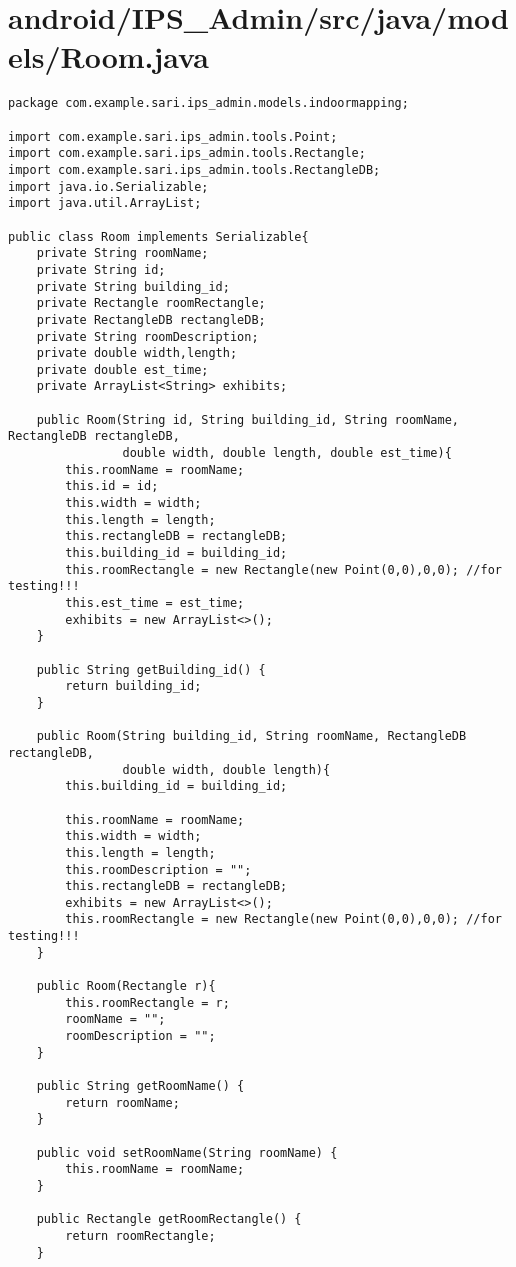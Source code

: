 \section{android/IPS\_Admin/src/java/models/Room.java}
\begin{lstlisting}package com.example.sari.ips_admin.models.indoormapping;

import com.example.sari.ips_admin.tools.Point;
import com.example.sari.ips_admin.tools.Rectangle;
import com.example.sari.ips_admin.tools.RectangleDB;
import java.io.Serializable;
import java.util.ArrayList;

public class Room implements Serializable{
    private String roomName;
    private String id;
    private String building_id;
    private Rectangle roomRectangle;
    private RectangleDB rectangleDB;
    private String roomDescription;
    private double width,length;
    private double est_time;
    private ArrayList<String> exhibits;

    public Room(String id, String building_id, String roomName, RectangleDB rectangleDB,
                double width, double length, double est_time){
        this.roomName = roomName;
        this.id = id;
        this.width = width;
        this.length = length;
        this.rectangleDB = rectangleDB;
        this.building_id = building_id;
        this.roomRectangle = new Rectangle(new Point(0,0),0,0); //for testing!!!
        this.est_time = est_time;
        exhibits = new ArrayList<>();
    }

    public String getBuilding_id() {
        return building_id;
    }

    public Room(String building_id, String roomName, RectangleDB rectangleDB,
                double width, double length){
        this.building_id = building_id;

        this.roomName = roomName;
        this.width = width;
        this.length = length;
        this.roomDescription = "";
        this.rectangleDB = rectangleDB;
        exhibits = new ArrayList<>();
        this.roomRectangle = new Rectangle(new Point(0,0),0,0); //for testing!!!
    }

    public Room(Rectangle r){
        this.roomRectangle = r;
        roomName = "";
        roomDescription = "";
    }

    public String getRoomName() {
        return roomName;
    }

    public void setRoomName(String roomName) {
        this.roomName = roomName;
    }

    public Rectangle getRoomRectangle() {
        return roomRectangle;
    }


\end{lstlisting}
